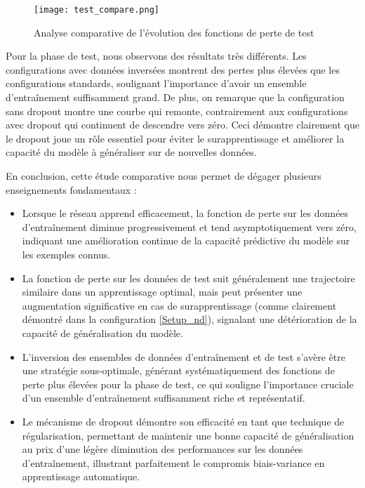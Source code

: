 \documentclass{article}
\begin{document}
\begin{figure}[H]
    \centering
    \texttt{[image: test\_compare.png]}
    \caption{Analyse comparative de l'évolution des fonctions de perte de test}
    \label{fig:test_compare}
\end{figure}

Pour la phase de test, nous observons des résultats très différents. Les configurations avec données inversées montrent des pertes plus élevées que les configurations standards, soulignant l'importance d'avoir un ensemble d'entraînement suffisamment grand. De plus, on remarque que la configuration sans dropout montre une courbe qui remonte, contrairement aux configurations avec dropout qui continuent de descendre vers zéro. Ceci démontre clairement que le dropout joue un rôle essentiel pour éviter le surapprentissage et améliorer la capacité du modèle à généraliser sur de nouvelles données.

En conclusion, cette étude comparative nous permet de dégager plusieurs enseignements fondamentaux :

\begin{itemize}
    \item Lorsque le réseau apprend efficacement, la fonction de perte sur les données d'entraînement diminue progressivement et tend asymptotiquement vers zéro, indiquant une amélioration continue de la capacité prédictive du modèle sur les exemples connus.
    \item La fonction de perte sur les données de test suit généralement une trajectoire similaire dans un apprentissage optimal, mais peut présenter une augmentation significative en cas de surapprentissage (comme clairement démontré dans la configuration \ref{Setup_nd}), signalant une détérioration de la capacité de généralisation du modèle.
    \item L'inversion des ensembles de données d'entraînement et de test s'avère être une stratégie sous-optimale, générant systématiquement des fonctions de perte plus élevées pour la phase de test, ce qui souligne l'importance cruciale d'un ensemble d'entraînement suffisamment riche et représentatif.
    \item Le mécanisme de dropout démontre son efficacité en tant que technique de régularisation, permettant de maintenir une bonne capacité de généralisation au prix d'une légère diminution des performances sur les données d'entraînement, illustrant parfaitement le compromis biais-variance en apprentissage automatique.
\end{itemize}
\end{document}
